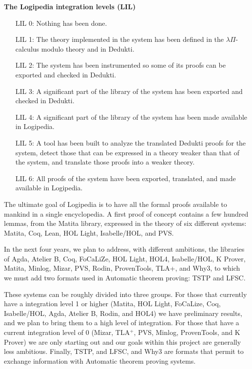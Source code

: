 \begin{framed}
  \vspace{-0.5cm}
\begin{center}
{\bf \Large The Logipedia integration levels (LIL)\label{lil}}
\end{center}

\begin{itemize}
\item[LIL 0:] Nothing has been done.

\item[LIL 1:] The theory implemented in the system has been defined in
  the $\lambda\Pi$-calculus modulo theory and in Dedukti.

\item[LIL 2:] The system has been instrumented so some of its proofs
  can be exported and checked in Dedukti.

\item[LIL 3:] A significant part of the library of the system has been
  exported and checked in Dedukti.

\item[LIL 4:] A significant part of the library of the system has
  been made available in Logipedia.

\item[LIL 5:] A tool has been built to analyze the translated Dedukti proofs
  for the system, detect those that can be expressed in a theory
  weaker than that of the system, and translate those proofs into a
  weaker theory.

\item[LIL 6:] All proofs of the system have been exported, translated,
  and made available in Logipedia.
\end{itemize}
\end{framed}

The ultimate goal of Logipedia is to have all the formal proofs
available to mankind in a single encyclopedia.  A first proof of
concept contains a few hundred lemmas, from the Matita library,
expressed in the theory of six different systems: Matita, Coq, Lean,
HOL Light, Isabelle/HOL, and PVS.

In the next four years, we plan to address, with different ambitions,
the libraries of Agda, Atelier B, Coq, FoCaLiZe, HOL Light, HOL4,
Isabelle/HOL, K Prover, Matita, Minlog, Mizar, PVS, Rodin,
ProvenTools, TLA+, and Why3, to which we must add two formats used in
Automatic theorem proving: TSTP and LFSC.

These systems can be roughly divided into three groups.  For those
that currently have a integration level 1 or higher (Matita, HOL
Light, FoCaLize, Coq, Isabelle/HOL, Agda, Atelier B, Rodin, and HOL4)
we have preliminary results, and we plan to bring them to a high level
of integration.  For those that have a current integration level of 0
(Mizar, TLA$^+$, PVS, Minlog, ProvenTools, and K Prover) we are only
starting out and our goals within this project are generally less
ambitious. Finally, TSTP, and LFSC, and Why3 are formats that permit
to exchange information with Automatic theorem proving systems.


